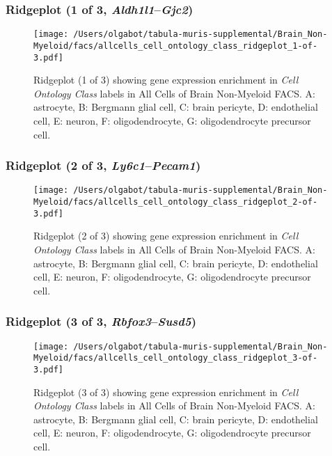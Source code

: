 \clearpage

\subsubsection{Ridgeplot (1 of 3, \emph{Aldh1l1}--\emph{Gjc2})}
\begin{figure}[h]
\centering
\texttt{[image: /Users/olgabot/tabula-muris-supplemental/Brain\_Non-Myeloid/facs/allcells\_cell\_ontology\_class\_ridgeplot\_1-of-3.pdf]}

\caption{ Ridgeplot (1 of 3)  showing gene expression enrichment in \emph{Cell Ontology Class} labels in All Cells of Brain Non-Myeloid FACS. A: astrocyte, B: Bergmann glial cell, C: brain pericyte, D: endothelial cell, E: neuron, F: oligodendrocyte, G: oligodendrocyte precursor cell.}
\end{figure}


\clearpage

\subsubsection{Ridgeplot (2 of 3, \emph{Ly6c1}--\emph{Pecam1})}
\begin{figure}[h]
\centering
\texttt{[image: /Users/olgabot/tabula-muris-supplemental/Brain\_Non-Myeloid/facs/allcells\_cell\_ontology\_class\_ridgeplot\_2-of-3.pdf]}

\caption{ Ridgeplot (2 of 3)  showing gene expression enrichment in \emph{Cell Ontology Class} labels in All Cells of Brain Non-Myeloid FACS. A: astrocyte, B: Bergmann glial cell, C: brain pericyte, D: endothelial cell, E: neuron, F: oligodendrocyte, G: oligodendrocyte precursor cell.}
\end{figure}


\clearpage

\subsubsection{Ridgeplot (3 of 3, \emph{Rbfox3}--\emph{Susd5})}
\begin{figure}[h]
\centering
\texttt{[image: /Users/olgabot/tabula-muris-supplemental/Brain\_Non-Myeloid/facs/allcells\_cell\_ontology\_class\_ridgeplot\_3-of-3.pdf]}

\caption{ Ridgeplot (3 of 3)  showing gene expression enrichment in \emph{Cell Ontology Class} labels in All Cells of Brain Non-Myeloid FACS. A: astrocyte, B: Bergmann glial cell, C: brain pericyte, D: endothelial cell, E: neuron, F: oligodendrocyte, G: oligodendrocyte precursor cell.}
\end{figure}


